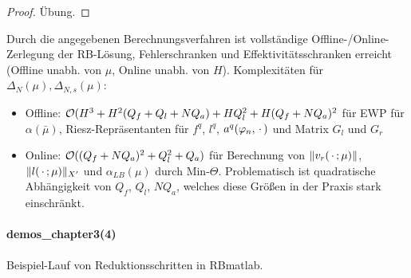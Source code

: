 \begin{proof}
	Übung.
\end{proof}

\begin{bem}[Komplexitäten]
	Durch die angegebenen Berechnungsverfahren ist vollständige Offline-/Online-Zerlegung der RB-Lösung, Fehlerschranken und Effektivitätsschranken erreicht (Offline unabh. von $\mu$, Online unabh. von $H$). Komplexitäten für $\Delta_N(\mu), \Delta_{N,s}(\mu)$:
	\begin{itemize}
		\item Offline: $\mathcal O(H^3 + H^2 (Q_f + Q_l + N Q_a) + H Q_l^2 + H(Q_f + NQ_a)^2$ für EWP für $\alpha(\bar{\mu})$,
			Riesz-Repräsentanten für $f^q$, $l^q$, $a^q(\varphi_n,\,\cdot\,)$ und Matrix $G_l$ und $G_r$
		\item Online: $\mathcal O((Q_f+N Q_a)^2 + Q_l^2 + Q_a)$ für Berechnung von $\|v_r(\,\cdot\,;\mu)\|$, $\|l(\,\cdot\,;\mu)\|_{X'}$ und $\alpha_{LB}(\mu)$ durch Min-$\Theta$.
			Problematisch ist quadratische Abhängigkeit von $Q_f$, $Q_l$, $N Q_a$, welches diese Größen in der Praxis stark einschränkt.
	\end{itemize}
\end{bem}

\paragraph{demos\_chapter3(4)} Beispiel-Lauf von Reduktionsschritten in RBmatlab.


